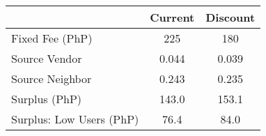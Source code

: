 \begin{tabular}{lcc}
& Current &  Discount \\
\hline
Fixed Fee (PhP) & 225 &180\\
Source Vendor & 0.044 & 0.039 \\
Source Neighbor &0.243 & 0.235 \\
 Surplus (PhP)  &143.0&153.1 \\
 Surplus: Low Users (PhP)  &76.4&84.0 \\
\hline
\end{tabular}
